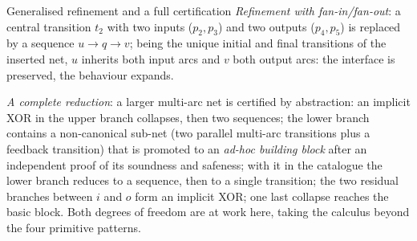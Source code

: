 \begin{examplebox}{Generalised refinement and a full certification}
\emph{Refinement with fan-in/fan-out}: a central transition $t_2$ with two inputs ($p_2, p_3$) and two outputs ($p_4, p_5$) is replaced by a sequence $u \to q \to v$; being the unique initial and final transitions of the inserted net, $u$ inherits both input arcs and $v$ both output arcs: the interface is preserved, the behaviour expands.
\par\smallskip
\emph{A complete reduction}: a larger multi-arc net is certified by abstraction: an implicit XOR in the upper branch collapses, then two sequences; the lower branch contains a non-canonical sub-net (two parallel multi-arc transitions plus a feedback transition) that is promoted to an \emph{ad-hoc building block} after an independent proof of its soundness and safeness; with it in the catalogue the lower branch reduces to a sequence, then to a single transition; the two residual branches between $i$ and $o$ form an implicit XOR; one last collapse reaches the basic block. Both degrees of freedom are at work here, taking the calculus beyond the four primitive patterns.
\end{examplebox}
